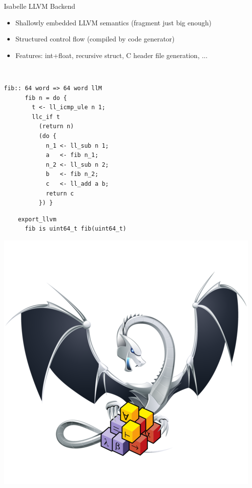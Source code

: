 \documentclass[fleqn]{beamer}
\begin{document}
\begin{frame}[fragile]{Isabelle LLVM Backend}
  \begin{itemize}
   \item Shallowly embedded LLVM semantics (fragment just big enough)
   \item Structured control flow (compiled by code generator)
   \item Features: int+float, recursive struct, C header file generation, ...

  \end{itemize}
  {\small
  \begin{minipage}{.05\textwidth}{\ }\end{minipage}
  \begin{minipage}{.45\textwidth}
    \begin{lstlisting}[escapechar=!]
      fib:: 64 word => 64 word llM
      fib n = do {
        t <- ll_icmp_ule n 1;
        llc_if t
          (return n)
          (do {
            n_1 <- ll_sub n 1;
            a   <- fib n_1;
            n_2 <- ll_sub n 2;
            b   <- fib n_2;
            c   <- ll_add a b;
            return c
          }) }
    \end{lstlisting}
  \end{minipage}%
  \begin{minipage}{.3\textwidth}
  \begin{lstlisting}
    export_llvm
      fib is uint64_t fib(uint64_t)
  \end{lstlisting}
  \includegraphics[width=\textwidth]{isabelle-llvm.png}
  \end{minipage}
  }

\end{frame}
\end{document}
